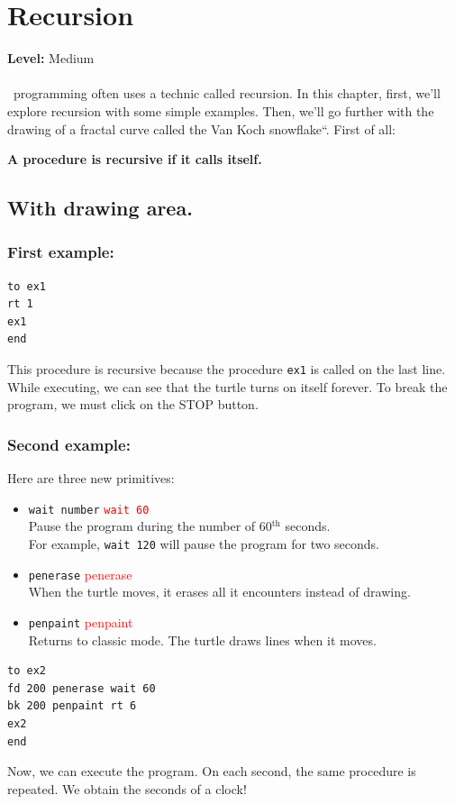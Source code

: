 \chapter{Recursion}
{ }\hfill\textbf{Level:} Medium\\ \\
\noindent \logo\ programming often uses a technic called recursion. In this chapter, first, we'll explore recursion with some simple examples. Then, we'll go further with the drawing of a fractal curve called the Van Koch snowflake``. First of all:
\begin{center}
\textbf{A procedure is recursive if it calls itself.}
\end{center}
\section{With drawing area.}
\subsection{First example:}
\begin{verbatim}
to ex1
rt 1
ex1
end  
\end{verbatim}
This procedure is recursive because the procedure \texttt{ex1} is called on the last line. While executing, we can see that the turtle turns on itself forever. To break the program, we must click on the STOP button.
\subsection{Second example:}
\noindent Here are three new primitives:
\begin{itemize}
\item \texttt{wait number}\hspace {4cm } \textcolor{red}{ \texttt{wait 60}}\\
Pause the program during the number of 60$^{\textrm{th}}$ seconds. \\
For example, \texttt{wait 120} will pause the program for two seconds.
\item \texttt{penerase}\hspace {4cm } \textcolor{red}{{penerase}}\\
When the turtle moves, it erases all it encounters instead of drawing.
\item \texttt{penpaint}\hspace {4cm } \textcolor{red}{penpaint}\\
Returns to classic mode. The turtle draws lines when it moves.
\end{itemize}
\noindent
\begin{verbatim}
to ex2
fd 200 penerase wait 60
bk 200 penpaint rt 6
ex2
end
\end{verbatim}
Now, we can execute the program. On each second, the same procedure is repeated. We obtain the seconds of a clock!
